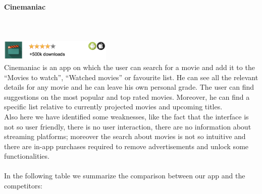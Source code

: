 \documentclass[12pt, a4paper]{article}
\numberwithin{figure}{section}
\begin{document}
\paragraph{Cinemaniac}\mbox{}\\\\
\includegraphics[width=0.4\textwidth]{Images/Cinemaniac.png}\\
Cinemaniac is an app on which the user can search for a movie and add it to the “Movies to watch”, “Watched movies” or favourite list.
He can see all the relevant details for any movie and he can leave his own personal grade.
The user can find suggestions on the most popular and top rated movies.
Moreover, he can find a specific list relative to currently projected movies and upcoming titles.\\
Also here we have identified some weaknesses, like the fact that the interface is not so user friendly, there is no user interaction,
there are no information about streaming platforms; moreover the search about movies is not so intuitive and there are
in-app purchases required to remove advertisements and unlock some functionalities.\\\\
In the following table we summarize the comparison between our app and the competitors:
\end{document}
